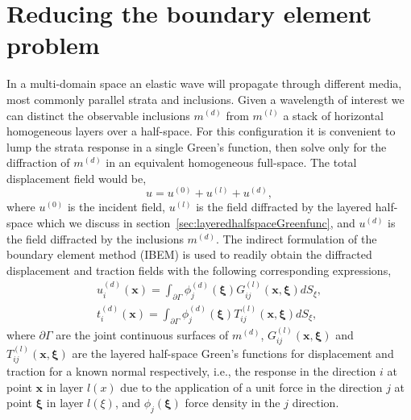\documentclass[preprint,5p,times]{elsarticle}
\begin{document}
\section{Reducing the boundary element problem}
In a multi-domain space an elastic wave will propagate through different media, most commonly parallel strata and inclusions. Given a wavelength of interest we can distinct the observable inclusions $m^{(d)}$ from $m^{(l)}$ a stack of horizontal homogeneous layers over a half-space. For this configuration it is convenient to lump the strata response in a single Green's function, then solve only for the diffraction of $m^{(d)}$ in an equivalent homogeneous full-space. The total displacement field would be,
\begin{equation}
u = u^{(0)} + u^{(l)} + u^{(d)},
\end{equation}
where $u^{(0)}$ is the incident field, $u^{(l)}$ is the field diffracted by the layered half-space which we discuss in section~\ref{sec:layeredhalfspaceGreenfunc}, and $u^{(d)}$ is the field diffracted by the inclusions $m^{(d)}$. The indirect formulation of the boundary element method (IBEM) \cite{Sanchez-sesma1995} is used to readily obtain the diffracted displacement and traction fields with the following corresponding expressions,
\begin{equation}
\begin{aligned}
u_i^{(d)}(\boldsymbol{x}) = \int_{\partial \Gamma} \phi^{(d)}_j(\boldsymbol{\xi}) G_{ij}^{(l)} (\boldsymbol{x},\boldsymbol{\xi}) d S_{\xi},\\
t_i^{(d)}(\boldsymbol{x}) = \int_{\partial \Gamma} \phi^{(d)}_j(\boldsymbol{\xi}) T_{ij}^{(l)} (\boldsymbol{x},\boldsymbol{\xi}) d S_{\xi},
\end{aligned}
\end{equation}
where $\partial \Gamma$ are the joint continuous surfaces of $m^{(d)}$, $G_{ij}^{(l)}(\boldsymbol{x},\boldsymbol{\xi})$ and $T_{ij}^{(l)}(\boldsymbol{x},\boldsymbol{\xi})$ are the layered half-space Green's functions for displacement and traction for a known normal respectively, i.e., the response in the direction $i$ at point $\boldsymbol{x}$ in layer $l(x)$ due to the application of a unit force in the direction $j$ at point $\boldsymbol{\xi}$ in layer $l(\xi)$, and $\phi_j(\boldsymbol{\xi})$ force density in the $j$ direction. 
\end{document}
